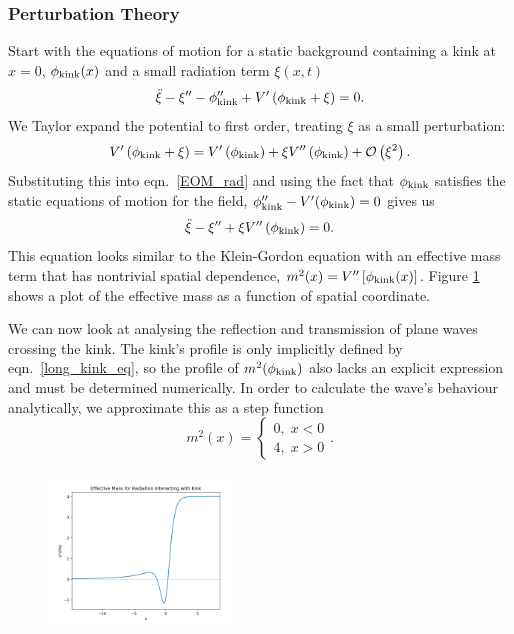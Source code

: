 \documentclass[11pt, oneside,titlepage]{article}  	%
\numberwithin{equation}{section}
\begin{document}
 \subsubsection{Perturbation Theory} \label{pert_theory}
Start with the equations of motion for a static background containing a kink at $x=0$, $\phi_\textup{kink}(x)$ and a small radiation term $\xi(x,t)$
\begin{equation}\label{EOM_rad}
\ddot{\xi} - \xi'' - \phi''_\textup{kink} + V' \left( \phi_\textup{kink} + \xi \right)= 0.
\end{equation}
We Taylor expand the potential to first order, treating $\xi$ as a small perturbation:
 \begin{equation}
 V' \left( \phi_\textup{kink} + \xi \right) = V' \left( \phi_\textup{kink} \right ) + \xi V'' \left( \phi_\textup{kink}\right) + \mathcal{O}\left(\xi^2 \right ).
 \end{equation}
 Substituting this into eqn.~\ref{EOM_rad} and using the fact that $\phi_\textup{kink}$ satisfies the static equations of motion for the field, $\phi_\textup{kink}'' - V'(\phi_\textup{kink}) = 0$ gives us
 \begin{equation}
\ddot{\xi} - \xi'' + \xi V'' \left( \phi_\textup{kink}\right)= 0.
\end{equation}
This equation looks similar to the Klein-Gordon equation with an effective mass term that has nontrivial spatial dependence, $m^2(x) = V''\left[\phi_\textup{kink}(x)\right]$. Figure \ref{mass_term} shows a plot of the effective mass as a function of spatial coordinate.\par
We can now look at analysing the reflection and transmission of plane waves crossing the kink. The kink's profile is only implicitly defined by eqn.~\ref{long_kink_eq}, so the profile of $m^2(\phi_{\textup{kink}})$ also lacks an explicit expression and must be determined numerically. In order to calculate the wave's behaviour analytically, we approximate this as a step function
\begin{equation}
m^2 (x) =\left\{\begin{matrix}
0, \; x<0\\ 
4, \; x>0
\end{matrix}\right. .
\end{equation}
\begin{figure}
\centering
 \includegraphics[width=0.45\textwidth]{mass_term.png}
  \label{mass_term}
\end{figure}
\end{document}
